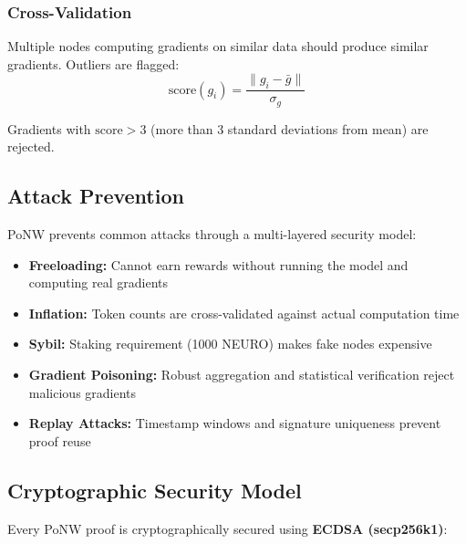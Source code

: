 \documentclass[11pt,a4paper]{article}
\begin{document}
\subsubsection{Cross-Validation}
Multiple nodes computing gradients on similar data should produce similar gradients. Outliers are flagged:
\begin{equation}
\text{score}(g_i) = \frac{\|g_i - \bar{g}\|}{\sigma_g}
\end{equation}

Gradients with $\text{score} > 3$ (more than 3 standard deviations from mean) are rejected.

\subsection{Attack Prevention}

PoNW prevents common attacks through a multi-layered security model:

\begin{itemize}
    \item \textbf{Freeloading:} Cannot earn rewards without running the model and computing real gradients
    \item \textbf{Inflation:} Token counts are cross-validated against actual computation time
    \item \textbf{Sybil:} Staking requirement (1000 NEURO) makes fake nodes expensive
    \item \textbf{Gradient Poisoning:} Robust aggregation and statistical verification reject malicious gradients
    \item \textbf{Replay Attacks:} Timestamp windows and signature uniqueness prevent proof reuse
\end{itemize}

\subsection{Cryptographic Security Model}

Every PoNW proof is cryptographically secured using \textbf{ECDSA (secp256k1)}:
\end{document}
